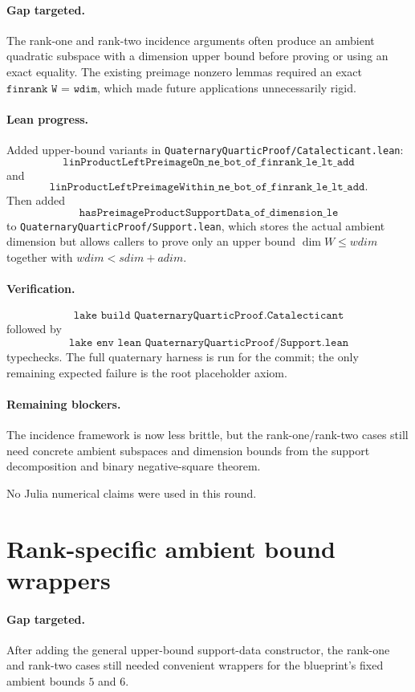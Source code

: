 \documentclass[11pt]{article}
\begin{document}
\paragraph{Gap targeted.}
The rank-one and rank-two incidence arguments often produce an ambient
quadratic subspace with a dimension upper bound before proving or using an
exact equality.  The existing preimage nonzero lemmas required an exact
\(\texttt{finrank W = wdim}\), which made future applications unnecessarily
rigid.

\paragraph{Lean progress.}
Added upper-bound variants in
\texttt{QuaternaryQuarticProof/Catalecticant.lean}:
\[
\texttt{linProductLeftPreimageOn\_ne\_bot\_of\_finrank\_le\_lt\_add}
\]
and
\[
\texttt{linProductLeftPreimageWithin\_ne\_bot\_of\_finrank\_le\_lt\_add}.
\]
Then added
\[
\texttt{hasPreimageProductSupportData\_of\_dimension\_le}
\]
to \texttt{QuaternaryQuarticProof/Support.lean}, which stores the actual
ambient dimension but allows callers to prove only an upper bound
\(\dim W\le wdim\) together with \(wdim<sdim+adim\).

\paragraph{Verification.}
\[
\texttt{lake build QuaternaryQuarticProof.Catalecticant}
\]
followed by
\[
\texttt{lake env lean QuaternaryQuarticProof/Support.lean}
\]
typechecks.  The full quaternary harness is run for the commit; the only
remaining expected failure is the root placeholder axiom.

\paragraph{Remaining blockers.}
The incidence framework is now less brittle, but the rank-one/rank-two cases
still need concrete ambient subspaces and dimension bounds from the support
decomposition and binary negative-square theorem.

No Julia numerical claims were used in this round.

\section*{Rank-specific ambient bound wrappers}

\paragraph{Gap targeted.}
After adding the general upper-bound support-data constructor, the rank-one
and rank-two cases still needed convenient wrappers for the blueprint's fixed
ambient bounds \(5\) and \(6\).
\end{document}
